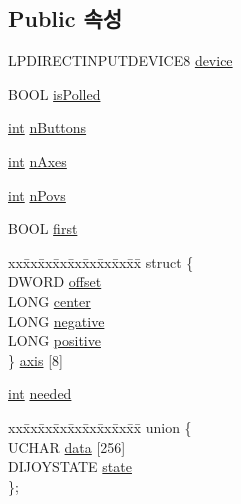 \subsection*{Public 속성}
\begin{DoxyCompactItemize}
\item 
L\+P\+D\+I\+R\+E\+C\+T\+I\+N\+P\+U\+T\+D\+E\+V\+I\+C\+E8 \mbox{\hyperlink{structdevice_info_a4e2b017b67b850eb267097f95776273f}{device}}
\item 
B\+O\+OL \mbox{\hyperlink{structdevice_info_a405fccb036e90884fb822c59433c2490}{is\+Polled}}
\item 
\mbox{\hyperlink{_util_8cpp_a0ef32aa8672df19503a49fab2d0c8071}{int}} \mbox{\hyperlink{structdevice_info_ad88fd10c7065c35ea68687b9871ebed0}{n\+Buttons}}
\item 
\mbox{\hyperlink{_util_8cpp_a0ef32aa8672df19503a49fab2d0c8071}{int}} \mbox{\hyperlink{structdevice_info_a5ceef6ccdfa5c12661b77e036ba91682}{n\+Axes}}
\item 
\mbox{\hyperlink{_util_8cpp_a0ef32aa8672df19503a49fab2d0c8071}{int}} \mbox{\hyperlink{structdevice_info_a5554d019728b7dace75256a64411417c}{n\+Povs}}
\item 
B\+O\+OL \mbox{\hyperlink{structdevice_info_a0bc40134953f30c68ccf0d2d69e67f17}{first}}
\item 
\begin{tabbing}
xx\=xx\=xx\=xx\=xx\=xx\=xx\=xx\=xx\=\kill
struct \{\\
\>DWORD \mbox{\hyperlink{structdevice_info_a224f64e679eb41aa2c894856d693d57d}{offset}}\\
\>LONG \mbox{\hyperlink{structdevice_info_a06a2e7b32ae7d9ca107f65b56920da72}{center}}\\
\>LONG \mbox{\hyperlink{structdevice_info_a8131c05a7b3332b266af2aa8f2e6528a}{negative}}\\
\>LONG \mbox{\hyperlink{structdevice_info_ae4cfa5b3fb76573fdf1e3936373ae47a}{positive}}\\
\} \mbox{\hyperlink{structdevice_info_aa3139c27b267c0ec8b6f4d96629ee0e2}{axis}} \mbox{[}8\mbox{]}\\

\end{tabbing}\item 
\mbox{\hyperlink{_util_8cpp_a0ef32aa8672df19503a49fab2d0c8071}{int}} \mbox{\hyperlink{structdevice_info_a3e85cef35fcad73f9f5fcd75a627ec80}{needed}}
\item 
\begin{tabbing}
xx\=xx\=xx\=xx\=xx\=xx\=xx\=xx\=xx\=\kill
union \{\\
\>UCHAR \mbox{\hyperlink{structdevice_info_a24db93457c0c8b0c0461e3db1c55ad48}{data}} \mbox{[}256\mbox{]}\\
\>DIJOYSTATE \mbox{\hyperlink{structdevice_info_a32e5855cac9794767be03c67be242c01}{state}}\\
\}; \\

\end{tabbing}\end{DoxyCompactItemize}


